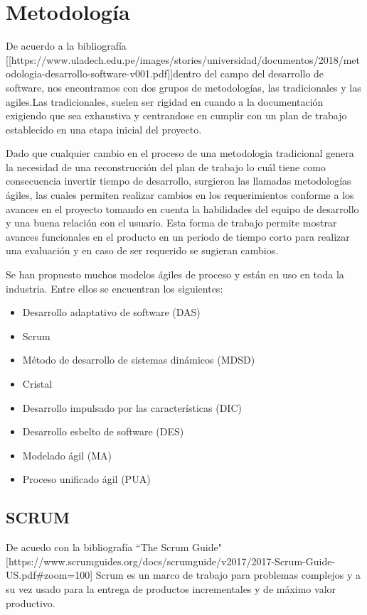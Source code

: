 \section{Metodología}

De acuerdo a la bibliografía [[https://www.uladech.edu.pe/images/stories/universidad/documentos/2018/metodologia-desarrollo-software-v001.pdf]]dentro del campo del desarrollo de software, nos encontramos con dos grupos de metodologías, las tradicionales y las agiles.Las tradicionales, suelen ser rigidad en cuando a la documentación exigiendo que sea exhaustiva y centrandose en cumplir con un plan de trabajo establecido en una etapa inicial del proyecto.


Dado que cualquier cambio en el proceso de una metodologia tradicional genera la necesidad de una reconstrucción del plan de trabajo lo cuál tiene como consecuencia invertir tiempo de desarrollo, surgieron las llamadas metodologías ágiles, las cuales permiten realizar cambios en los requerimientos conforme a los avances en el proyecto tomando en cuenta la habilidades del equipo de desarrollo y una buena relación con el usuario. Esta forma de trabajo permite mostrar avances funcionales en el producto en un periodo de tiempo corto para realizar una evaluación y en caso de ser requerido se sugieran cambios.

Se han propuesto muchos modelos ágiles de proceso y están en uso en toda la industria. Entre ellos se encuentran los siguientes:


\begin{itemize}
	\item Desarrollo adaptativo de software (DAS)
	\item Scrum
	\item Método de desarrollo de sistemas dinámicos (MDSD)
	\item Cristal
	\item Desarrollo impulsado por las características (DIC)
	\item Desarrollo esbelto de software (DES)
	\item Modelado ágil (MA)
	\item Proceso unificado ágil (PUA)
\end{itemize}

\subsection{SCRUM}

De acuedo con la bibliografía ``The Scrum Guide"[https://www.scrumguides.org/docs/scrumguide/v2017/2017-Scrum-Guide-US.pdf#zoom=100] Scrum es un marco de trabajo para problemas complejos y a su vez usado para la entrega de productos incrementales y de máximo valor productivo.



